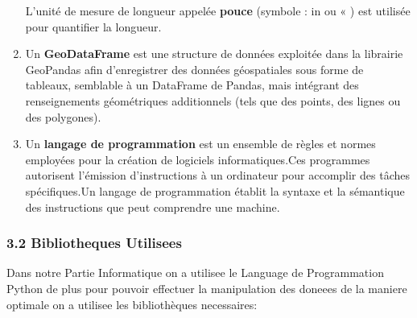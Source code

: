 \documentclass[
]{article}
\begin{document}
\begin{enumerate}
  L'unité de mesure de longueur appelée \textbf{pouce} (symbole : in ou
  « ) est utilisée pour quantifier la longueur.
\item
  Un \textbf{GeoDataFrame} est une structure de données exploitée dans
  la librairie GeoPandas afin d'enregistrer des données géospatiales
  sous forme de tableaux, semblable à un DataFrame de Pandas, mais
  intégrant des renseignements géométriques additionnels (tels que des
  points, des lignes ou des polygones).
\item
  Un \textbf{langage de programmation} est un ensemble de règles et
  normes employées pour la création de logiciels informatiques.Ces
  programmes autorisent l'émission d'instructions à un ordinateur pour
  accomplir des tâches spécifiques.Un langage de programmation établit
  la syntaxe et la sémantique des instructions que peut comprendre une
  machine.
\end{enumerate}

\subsubsection{3.2 Bibliotheques
Utilisees}\label{bibliotheques-utilisees}

Dans notre Partie Informatique on a utilisee le Language de
Programmation Python de plus pour pouvoir effectuer la manipulation des
doneees de la maniere optimale on a utilisee les bibliothèques
necessaires:
\end{document}
